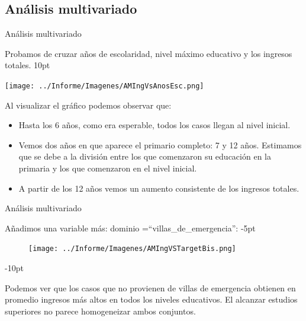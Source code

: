 \documentclass[pdf]{beamer}
\def\vspace{}%
\begin{document}
{%

    \subsection{Análisis multivariado}

\begin{frame}{Análisis multivariado}
    \footnotesize

    Probamos de cruzar años de escolaridad, nivel máximo educativo y los ingresos totales.
    \vspace{10pt}

    \begin{minipage}{0.5\textwidth}
        \texttt{[image: ../Informe/Imagenes/AMIngVsAnosEsc.png]}
    \end{minipage}
\begin{minipage}{0.45\textwidth}


    Al visualizar el gráfico podemos observar que:

    \begin{itemize}
        \footnotesize
        \justifying%
        \item Hasta los 6 años, como era esperable, todos los casos llegan al nivel inicial.
        \item Vemos dos años en que aparece el primario completo: 7 y 12 años. Estimamos que se debe a la división entre los que comenzaron su educación en la primaria y los que comenzaron en el nivel inicial.
        \item A partir de los 12 años vemos un aumento consistente de los ingresos totales.
    \end{itemize}
\end{minipage}
\end{frame} 

\begin{frame}{Análisis multivariado}

    \footnotesize

    Añadimos una variable más: dominio =``villas\_de\_emergencia'':
    \vspace{-5pt}

    \begin{figure}[H]
        \texttt{[image: ../Informe/Imagenes/AMIngVSTargetBis.png]}
    \end{figure}
    \vspace{-10pt}
    
    Podemos ver que los casos que no provienen de villas de emergencia  obtienen en promedio ingresos más altos en todos los niveles educativos. El alcanzar estudios superiores no parece homogeneizar ambos conjuntos. 


\end{frame}}
\end{document}
